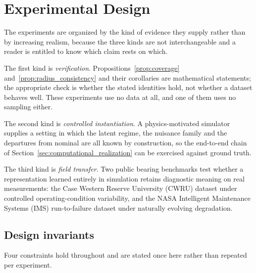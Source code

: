 \documentclass[a4paper]{cas-sc}
\begin{document}
\section{Experimental Design}
\label{sec:experimental_design}

The experiments are organized by the kind of evidence they supply rather than
by increasing realism, because the three kinds are not interchangeable and a
reader is entitled to know which claim rests on which.

The first kind is \emph{verification}. Propositions~\ref{prop:coverage}
and~\ref{prop:radius_consistency} and their corollaries are mathematical
statements; the appropriate check is whether the stated identities hold, not
whether a dataset behaves well. These experiments use no data at all, and one
of them uses no sampling either.

The second kind is \emph{controlled instantiation}. A physics-motivated
simulator supplies a setting in which the latent regime, the nuisance family
and the departures from nominal are all known by construction, so the
end-to-end chain of Section~\ref{sec:computational_realization} can be
exercised against ground truth.

The third kind is \emph{field transfer}. Two public bearing benchmarks test
whether a representation learned entirely in simulation retains diagnostic
meaning on real measurements: the Case Western Reserve University (CWRU)
dataset under controlled operating-condition variability, and the NASA
Intelligent Maintenance Systems (IMS) run-to-failure dataset under naturally
evolving degradation.

\subsection{Design invariants}
\label{subsec:design_invariants}

Four constraints hold throughout and are stated once here rather than repeated
per experiment.
\end{document}
